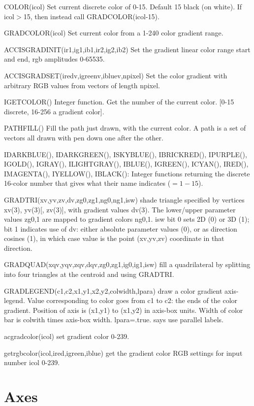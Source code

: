 \documentclass[12pt]{article}
\newif \iftth
\begin{document}
\iftth \special{html:<a href="filltest.f"><img align="right" src="filltest.png"></a>}\fi
COLOR(icol) Set current discrete color of 0-15. Default 15 black (on
white). If icol$>$15, then instead call GRADCOLOR(icol-15).

GRADCOLOR(icol) Set current color from a 1-240 color gradient range.

ACCISGRADINIT(ir1,ig1,ib1,ir2,ig2,ib2) Set the gradient linear color
range start and end, rgb amplitudes 0-65535.

ACCISGRADSET(iredv,igreenv,ibluev,npixel) Set the color gradient with
arbitrary RGB values from vectors of length npixel.

IGETCOLOR() Integer function.  Get the number of the current
color. [0-15 discrete, 16-256 a gradient color].

PATHFILL() Fill the path just drawn, with the current color. A path is
a set of vectors all drawn with pen down one after the other.

IDARKBLUE(), IDARKGREEN(),  ISKYBLUE(),  IBRICKRED(),  IPURPLE(),
IGOLD(),  IGRAY(),  ILIGHTGRAY(),  IBLUE(),  IGREEN(),  ICYAN(),
IRED(),  IMAGENTA(),  IYELLOW(),  IBLACK(): Integer functions returning
the discrete 16-color number that gives what their name indicates ($=1-15$).

GRADTRI(xv,yv,zv,dv,zg0,zg1,ng0,ng1,isw) shade triangle specified by
vertices xv(3), yv(3)[, zv(3)], with gradient values dv(3). The
lower/upper parameter values zg0,1 are mapped to gradient colors
ng0,1. isw bit 0 sets 2D (0) or 3D (1); bit 1 indicates use of dv:
either absolute parameter values (0), or as direction cosines (1), in
which case value is the point (xv,yv,zv) coordinate in that direction.

GRADQUAD(xqv,yqv,zqv,dqv,zg0,zg1,ig0,ig1,isw) fill a quadrilateral 
by splitting into four triangles at the centroid and using GRADTRI. 

GRADLEGEND(c1,c2,x1,y1,x2,y2,colwidth,lpara) draw a color gradient
axis-legend. Value corresponding to color goes from c1 to c2: the ends of
the color gradient. Position of axis is (x1,y1) to (x1,y2) in axis-box
units. Width of color bar is colwith times axis-box
width. lpara=.true. says use parallel labels.

acgradcolor(icol) set gradient color 0-239.

getrgbcolor(icol,ired,igreen,iblue) get the gradient color RGB
settings for input number icol 0-239.

\section{Axes}
\end{document}
